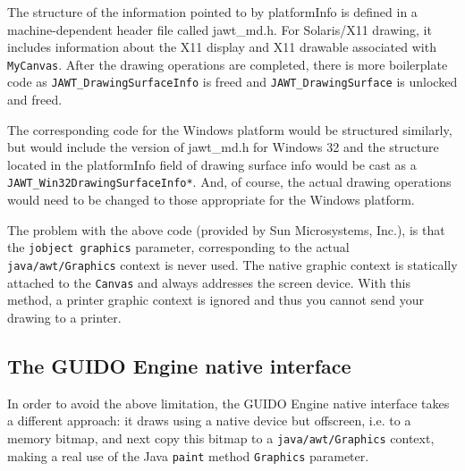 \documentclass[a4paper]{article}
\newcommand{\code}[1]			{\texttt{#1}}
\begin{document}
The structure of the information pointed to by platformInfo is defined in a machine-dependent header file called jawt\_md.h. For Solaris/X11 drawing, it includes information about the X11 display and X11 drawable associated with \code{MyCanvas}. After the drawing operations are completed, there is more boilerplate code as \code{JAWT\_DrawingSurfaceInfo} is freed and \code{JAWT\_DrawingSurface} is unlocked and freed.

The corresponding code for the Windows platform would be structured similarly, but would include the version of jawt\_md.h for Windows 32 and the structure located in the platformInfo field of drawing surface info would be cast as a \code{JAWT\_Win32DrawingSurfaceInfo*}. And, of course, the actual drawing operations would need to be changed to those appropriate for the Windows platform.

The problem with the above code (provided by Sun Microsystems, Inc.), is that the \code{jobject graphics} parameter, corresponding to the actual \code{java/awt/Graphics} context is never used. The native graphic context is statically attached to the \code{Canvas} and always addresses the screen device. With this method, a printer graphic context is ignored and thus you cannot send your drawing to a printer.


\subsection{The GUIDO Engine native interface}

In order to avoid the above limitation, the GUIDO Engine native interface takes a different approach: it draws using a native device but offscreen, i.e. to a memory bitmap, and next copy this bitmap to a \code{java/awt/Graphics} context, making a real use of the Java \code{paint} method \code{Graphics} parameter. 
\end{document}
